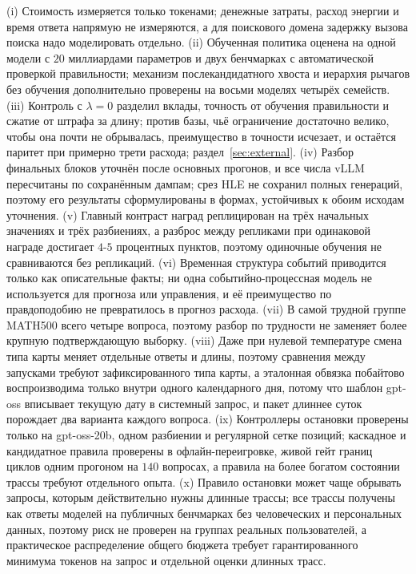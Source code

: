 \documentclass[11pt]{article}
\begin{document}
(i) Стоимость измеряется только токенами; денежные затраты, расход энергии и время ответа напрямую не измеряются, а для поискового домена задержку вызова поиска надо моделировать отдельно. (ii) Обученная политика оценена на одной модели с $20$ миллиардами параметров и двух бенчмарках с автоматической проверкой правильности; механизм послекандидатного хвоста и иерархия рычагов без обучения дополнительно проверены на восьми моделях четырёх семейств. (iii) Контроль с $\lambda=0$ разделил вклады, точность от обучения правильности и сжатие от штрафа за длину; против базы, чьё ограничение достаточно велико, чтобы она почти не обрывалась, преимущество в точности исчезает, и остаётся паритет при примерно трети расхода; раздел~\ref{sec:external}. (iv) Разбор финальных блоков уточнён после основных прогонов, и все числа vLLM пересчитаны по сохранённым дампам; срез HLE не сохранил полных генераций, поэтому его результаты сформулированы в формах, устойчивых к обоим исходам уточнения. (v) Главный контраст наград реплицирован на трёх начальных значениях и трёх разбиениях, а разброс между репликами при одинаковой награде достигает $4$-$5$ процентных пунктов, поэтому одиночные обучения не сравниваются без репликаций. (vi) Временная структура событий приводится только как описательные факты; ни одна событийно-процессная модель не используется для прогноза или управления, и её преимущество по правдоподобию не превратилось в прогноз расхода. (vii) В самой трудной группе MATH500 всего четыре вопроса, поэтому разбор по трудности не заменяет более крупную подтверждающую выборку. (viii) Даже при нулевой температуре смена типа карты меняет отдельные ответы и длины, поэтому сравнения между запусками требуют зафиксированного типа карты, а эталонная обвязка побайтово воспроизводима только внутри одного календарного дня, потому что шаблон gpt-oss вписывает текущую дату в системный запрос, и пакет длиннее суток порождает два варианта каждого вопроса. (ix) Контроллеры остановки проверены только на gpt-oss-20b, одном разбиении и регулярной сетке позиций; каскадное и кандидатное правила проверены в офлайн-переигровке, живой гейт границ циклов одним прогоном на $140$ вопросах, а правила на более богатом состоянии трассы требуют отдельного опыта. (x) Правило остановки может чаще обрывать запросы, которым действительно нужны длинные трассы; все трассы получены как ответы моделей на публичных бенчмарках без человеческих и персональных данных, поэтому риск не проверен на группах реальных пользователей, а практическое распределение общего бюджета требует гарантированного минимума токенов на запрос и отдельной оценки длинных трасс.



\end{document}
